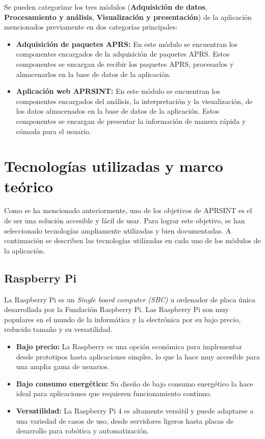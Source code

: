 Se pueden categorizar los tres módulos (\textbf{Adquisición de datos}, \textbf{Procesamiento y análisis}, \textbf{Visualización y presentación}) de la aplicación mencionados previamente en dos categorías principales:

\begin{itemize}
	\item \textbf{Adquisición de paquetes APRS:} En este módulo se encuentran los componentes encargados de la adquisición de paquetes APRS. Estos componentes se encargan de recibir los paquetes APRS, procesarlos y almacenarlos en la base de datos de la aplicación.

	\item \textbf{Aplicación web APRSINT:} En este módulo se encuentran los componentes encargados del análisis, la interpretación y la visualización, de los datos almacenados en la base de datos de la aplicación. Estos componentes se encargan de presentar la información de manera rápida y cómoda para el usuario.
\end{itemize}

\section{Tecnologías utilizadas y marco teórico}

Como se ha mencionado anteriormente, uno de los objetivos de APRSINT es el de ser una solución accesible y fácil de usar. Para lograr este objetivo, se han seleccionado tecnologías ampliamente utilizadas y bien documentadas. A continuación se describen las tecnologías utilizadas en cada uno de los módulos de la aplicación.
\subsection{Raspberry Pi}

La Raspberry Pi es un \textit{Single board computer (SBC)} u ordenador de placa única desarrollada por la Fundación Raspberry Pi. Las Raspberry Pi son muy populares en el mundo de la informática y la electrónica por su bajo precio, reducido tamaño y su versatilidad.

\begin{itemize}
	\item \textbf{Bajo precio:} La Raspberry es una opción económica para implementar desde prototipos hasta aplicaciones simples, lo que la hace muy accesible para una amplia gama de usuarios.
	\item \textbf{Bajo consumo energético:} Su diseño de bajo consumo energético la hace ideal para aplicaciones que requieren funcionamiento continuo.
	\item \textbf{Versatilidad:} La Raspberry Pi 4 es altamente versátil y puede adaptarse a una variedad de casos de uso, desde servidores ligeros hasta placas de desarrollo para robótica y automatización.
\end{itemize}

